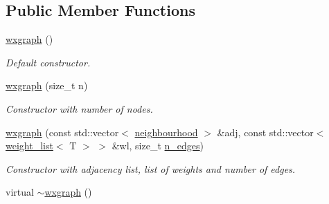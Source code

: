 \subsection*{Public Member Functions}
\begin{DoxyCompactItemize}
\item 
\hypertarget{classlgraph_1_1wxgraph_ac5cda7ed506eeede338eddf6ef51e4bd}{\hyperlink{classlgraph_1_1wxgraph_ac5cda7ed506eeede338eddf6ef51e4bd}{wxgraph} ()}\label{classlgraph_1_1wxgraph_ac5cda7ed506eeede338eddf6ef51e4bd}

\begin{DoxyCompactList}\small\item\em Default constructor. \end{DoxyCompactList}\item 
\hypertarget{classlgraph_1_1wxgraph_a84b632e0a65c1cba7e5e91afc576c91e}{\hyperlink{classlgraph_1_1wxgraph_a84b632e0a65c1cba7e5e91afc576c91e}{wxgraph} (size\-\_\-t n)}\label{classlgraph_1_1wxgraph_a84b632e0a65c1cba7e5e91afc576c91e}

\begin{DoxyCompactList}\small\item\em Constructor with number of nodes. \end{DoxyCompactList}\item 
\hyperlink{classlgraph_1_1wxgraph_a6b99dfb7f13c6a8f223b74fecd0ea4a5}{wxgraph} (const std\-::vector$<$ \hyperlink{namespacelgraph_a052e7766c13f3a43cec0aec8173fdede}{neighbourhood} $>$ \&adj, const std\-::vector$<$ \hyperlink{namespacelgraph_a1e0fd5ef0a78b2a92da48adbed265cb6}{weight\-\_\-list}$<$ T $>$ $>$ \&wl, size\-\_\-t \hyperlink{classlgraph_1_1xxgraph_a8ca991d1521cb6ba77e1cd3494ab42be}{n\-\_\-edges})
\begin{DoxyCompactList}\small\item\em Constructor with adjacency list, list of weights and number of edges. \end{DoxyCompactList}\item 
\hypertarget{classlgraph_1_1wxgraph_ab36035f4ca3a467ad239457eea053128}{virtual \hyperlink{classlgraph_1_1wxgraph_ab36035f4ca3a467ad239457eea053128}{$\sim$wxgraph} ()}\label{classlgraph_1_1wxgraph_ab36035f4ca3a467ad239457eea053128}


\end{DoxyCompactItemize}
